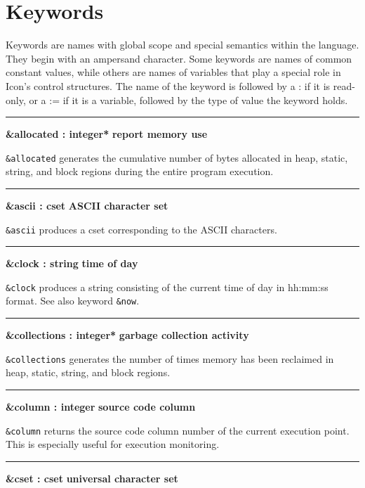 \section{Keywords}

Keywords are names with global scope and special semantics within
the language. They begin with an ampersand character. Some keywords are names of
common constant values, while others are names of variables that play a special
role in Icon's control structures. The
name of the keyword is followed by a : if it is read-only, or a := if it is a
variable, followed by the type of value the keyword holds.

\bigskip\hrule\vspace{0.1cm}
\noindent
{\bf \&allocated : integer* } \hfill {\bf report memory use}

\noindent
{}\texttt{\&allocated} generates the cumulative number
of bytes allocated in heap, static, string, and block regions during
the entire program execution.

\bigskip\hrule\vspace{0.1cm}
\noindent
{\bf \&ascii : cset } \hfill {\bf ASCII character set}

\noindent
{}\texttt{\&ascii} produces a cset corresponding to
the ASCII characters.

\bigskip\hrule\vspace{0.1cm}
\noindent
{\bf \&clock : string } \hfill {\bf time of day}

\noindent
\texttt{\&clock} produces a string consisting of the current
time of day in hh:mm:ss format.
See also keyword \texttt{\&now}.

\bigskip\hrule\vspace{0.1cm}
\noindent
{\bf \&collections : integer* } \hfill {\bf garbage collection activity}

\noindent
{}\texttt{\&collections} generates the number of
times memory has been reclaimed in heap, static, string, and block
regions.

\bigskip\hrule\vspace{0.1cm}
\noindent
{\bf \&column : integer } \hfill {\bf source code column}

\noindent
\texttt{\&column} returns the source code
column number of the current execution point. This
is especially useful for execution monitoring.

\bigskip\hrule\vspace{0.1cm}
\noindent
{\bf \&cset : cset } \hfill {\bf universal character set}

